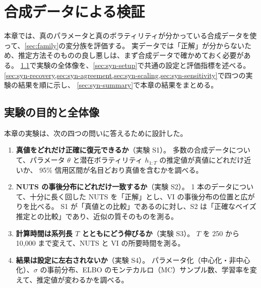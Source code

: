 \section{合成データによる検証}\label{sec:synthetic}

本章では、真のパラメータと真のボラティリティが分かっている合成データを使って、\cref{sec:family}の変分族を評価する。
実データでは「正解」が分からないため、推定方法そのものの良し悪しは、まず合成データで確かめておく必要がある。
\cref{sec:syn-overview}で実験の全体像を、\cref{sec:syn-setup}で共通の設定と評価指標を述べる。
\cref{sec:syn-recovery,sec:syn-agreement,sec:syn-scaling,sec:syn-sensitivity}で四つの実験の結果を順に示し、
\cref{sec:syn-summary}で本章の結果をまとめる。

\subsection{実験の目的と全体像}\label{sec:syn-overview}

本章の実験は、次の四つの問いに答えるために設計した。

\begin{enumerate}[label=(Q\arabic*)]
  \item \textbf{真値をどれだけ正確に復元できるか}（実験 S1）。
    多数の合成データについて、パラメータ $\theta$ と潜在ボラティリティ $h_{1:T}$ の推定値が真値にどれだけ近いか、
    95\% 信用区間が名目どおり真値を含むかを調べる。
  \item \textbf{NUTS の事後分布にどれだけ一致するか}（実験 S2）。
    1 本のデータについて、十分に長く回した NUTS を「正解」とし、VI の事後分布の位置と広がりを比べる。
    S1 が「真値との比較」であるのに対し、S2 は「正確なベイズ推定との比較」であり、近似の質そのものを測る。
  \item \textbf{計算時間は系列長 $T$ とともにどう伸びるか}（実験 S3）。
    $T$ を 250 から 10,000 まで変えて、NUTS と VI の所要時間を測る。
  \item \textbf{結果は設定に左右されないか}（実験 S4）。
    パラメータ化（中心化・非中心化）、$\sigma$ の事前分布、ELBO のモンテカルロ（MC）サンプル数、学習率を変えて、推定値が変わるかを調べる。
\end{enumerate}

